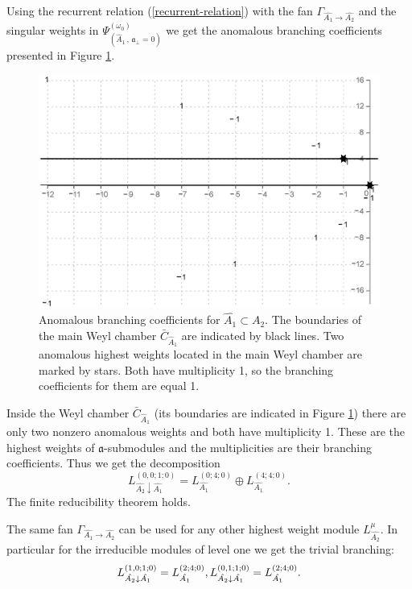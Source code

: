 \documentclass[12pt]{iopart}
\theoremstyle{definition}
\newcommand{\af}{\mathfrak{a}}
\newcommand{\afb}{\mathfrak{a}_{\bot}}
\begin{document}
Using the recurrent relation (\ref{recurrent-relation}) with the fan
$\Gamma_{\hat{A_1}\rightarrow \hat{A_2}}$ and the singular weights in
$\Psi ^{\left( \omega_0 \right) }_{\left(  \hat A_1\, , \, \afb=0 \right)}$
we get the anomalous branching coefficients presented
in Figure \ref{fig:AffineA2_A1_branching}.
\begin{figure}[h!tb]
  \centering
  \includegraphics[width=130mm]{figure9.eps}
  \caption{Anomalous branching coefficients for $\hat{A_1}\subset \hat{A_2}$. The boundaries
  of the main Weyl chamber $\bar{C}_{\hat{A}_1}$
 are indicated by black lines. Two anomalous highest weights located
 in the main Weyl chamber are marked by stars.
 Both have multiplicity 1, so the branching coefficients for them are equal 1.}
  \label{fig:AffineA2_A1_branching}
\end{figure}
Inside the Weyl chamber $\bar{C}_{\hat{A}_1}$
(its boundaries are indicated in Figure \ref{fig:AffineA2_A1_branching})
there are only two nonzero anomalous weights and both have multiplicity 1.
These are the highest weights of $\af$-submodules and the multiplicities are their branching
coefficients. Thus we get the decomposition
\begin{equation*}
  \label{eq:43}
  L^{(0,0;1;0)}_{\hat{A_2}\downarrow \hat{A_1}}= L_{\hat{A_1}}^{(0;4;0)}\oplus L_{\hat{A_1}}^{(4;4;0)}.
\end{equation*}
The finite reducibility theorem holds.

The same fan $\Gamma_{\hat{A_1}\rightarrow \hat{A_2}}$ can be used for any other highest weight
module $L^{\mu}_{\hat{A_2}}$. In particular for the irreducible modules of level one  we get the trivial
branching:
\begin{equation*}
  \label{eq:44}
   L^{(1,0;1;0)}_{\hat{A_2}\downarrow \hat{A_1}}= L_{\hat{A_1}}^{(2;4;0)},\\
   L^{(0,1;1;0)}_{\hat{A_2}\downarrow \hat{A_1}}= L_{\hat{A_1}}^{(2;4;0)}.
\end{equation*}
\end{document}
